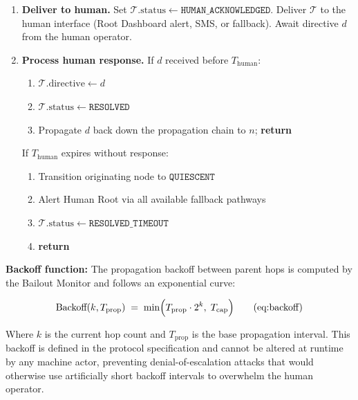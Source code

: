 \begin{algorithm}[H]
\begin{enumerate}
\item \label{step:deliver}\textbf{Deliver to human.} Set
  $\mathcal{T}.\text{status} \leftarrow \texttt{HUMAN\_ACKNOWLEDGED}$.
  Deliver $\mathcal{T}$ to the human interface (Root Dashboard alert,
  SMS, or fallback). Await directive $d$ from the human operator.

\item \textbf{Process human response.} If $d$ received before
  $T_{\text{human}}$:
  \begin{enumerate}
  \item $\mathcal{T}.\text{directive} \leftarrow d$
  \item $\mathcal{T}.\text{status} \leftarrow \texttt{RESOLVED}$
  \item Propagate $d$ back down the propagation chain to $n$; \textbf{return}
  \end{enumerate}
  If $T_{\text{human}}$ expires without response:
  \begin{enumerate}
  \item Transition originating node to $\texttt{QUIESCENT}$
  \item Alert Human Root via all available fallback pathways
  \item $\mathcal{T}.\text{status} \leftarrow \texttt{RESOLVED\_TIMEOUT}$
  \item \textbf{return}
  \end{enumerate}
\end{enumerate}
\end{algorithm}

\bigskip
\noindent\textbf{Backoff function:} The propagation backoff between parent
hops is computed by the Bailout Monitor and follows an exponential curve:

\begin{equation}
\text{Backoff}(k, T_{\text{prop}}) \;=\; \min\Bigl(
  T_{\text{prop}} \cdot 2^{k},\;
  T_{\text{cap}} \Bigr) \tag{eq:backoff}
\end{equation}

Where $k$ is the current hop count and $T_{\text{prop}}$ is the base
propagation interval. This backoff is defined in the protocol specification
and cannot be altered at runtime by any machine actor, preventing
denial-of-escalation attacks that would otherwise use artificially short
backoff intervals to overwhelm the human operator.


